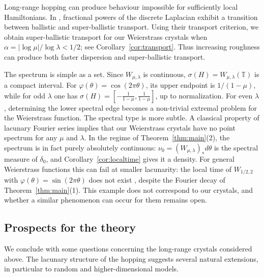 \documentclass[11pt]{amsart}
\theoremstyle{plain}
\theoremstyle{definition}
\numberwithin{equation}{section}
\begin{document}
Long-range hopping can produce behaviour impossible for sufficiently local Hamiltonians. In \cite{KernerPostSabriTaufer}, fractional powers of the discrete Laplacian exhibit a transition between ballistic and super-ballistic transport. Using their transport criterion, we obtain super-ballistic transport for our Weierstrass crystals when $\alpha=|\log\mu|/\log\lambda<1/2$; see Corollary~\ref{cor:transport}. Thus increasing roughness can produce both faster dispersion and super-ballistic transport.

The spectrum is simple as a set. Since $W_{\mu,\lambda}$ is continuous, $\sigma(H)=W_{\mu,\lambda}(\mathbb T)$ is a compact interval. For $\varphi(\theta)=\cos(2\pi\theta)$, its upper endpoint is $1/(1-\mu)$, while for odd $\lambda$ one has $\sigma(H)=\left[-\frac{1}{1-\mu},\frac{1}{1-\mu}\right]$, up to normalization. For even $\lambda$, determining the lower spectral edge becomes a non-trivial extremal problem for the Weierstrass function. The spectral type is more subtle. A classical property of lacunary Fourier series \cite[Vol.~II, p.~267]{Bary} implies that our Weierstrass crystals have no point spectrum for any $\mu$ and $\lambda$. In the regime of Theorem~\ref{thm:main}(2), the spectrum is in fact purely absolutely continuous: $\nu_0=(W_{\mu,\lambda})_*d\theta$ is the spectral measure of $\delta_0$, and Corollary~\ref{cor:localtime} gives it a density. For general Weierstrass functions this can fail at smaller lacunarity: the local time of $W_{1/2,2}$ with $\varphi(\theta)=\sin(2\pi\theta)$ does not exist \cite{Buc}, despite the Fourier decay of Theorem~\ref{thm:main}(1). This example does not correspond to our crystals, and whether a similar phenomenon can occur for them remains open.



\subsection{Prospects for the theory}

We conclude with some questions concerning the long-range crystals considered above. The lacunary structure of the hopping suggests several natural extensions, in particular to random and higher-dimensional models.
\end{document}
